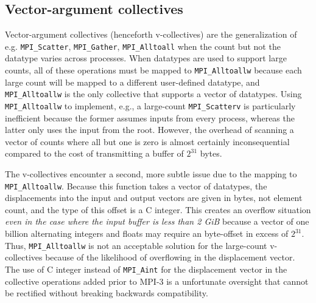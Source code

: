 
\subsection{Vector-argument collectives}

Vector-argument collectives (henceforth v-collectives) are the generalization of 
e.g. \texttt{MPI\_Scatter}, \texttt{MPI\_Gather}, \texttt{MPI\_Alltoall}
when the count but not the datatype varies across processes.
When datatypes are used to support large counts, all of these operations must be
mapped to \texttt{MPI\_Alltoallw} because each large count will be mapped
to a different user-defined datatype, and \texttt{MPI\_Alltoallw} is the only collective
that supports a vector of datatypes.
Using \texttt{MPI\_Alltoallw} to implement, e.g., a large-count \texttt{MPI\_Scatterv} is
particularly inefficient because the former assumes inputs from every process,
whereas the latter only uses the input from the root.
However, the overhead of scanning a vector of counts where all but one is zero
is almost certainly inconsequential compared to the cost of transmitting a buffer 
of $2^{31}$ bytes.


The v-collectives encounter a second, more subtle issue due to the mapping to
\texttt{MPI\_Alltoallw}.  Because this function takes a vector of datatypes, the
displacements into the input and output vectors are given in bytes,
not element count, and the type of this offset is a C integer.
This creates an overflow situation \textit{even in the case
where the input buffer is less than 2 GiB} because a vector of one billion
alternating integers and floats may require an byte-offset in excess of $2^{31}$.
Thus, \texttt{MPI\_Alltoallw} is not an acceptable solution for the large-count
v-collectives because of the likelihood of overflowing in the displacement vector.
The use of C integer instead of \texttt{MPI\_Aint} for the displacement vector in
the  collective operations added prior to MPI-3 is a unfortunate oversight that
cannot be rectified without breaking backwards compatibility.


